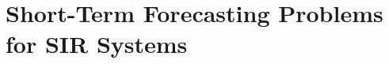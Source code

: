 \section{Short-Term Forecasting Problems for SIR Systems}
\label{sec:prob_form}

\iffalse


\newcommand{\tNewInfs}{\mbox{$t$}-\textsc{NewInf}\mbox{$(S)$}}
\newcommand{\tNewInfv}{\mbox{$t$}-\textsc{NewInf}\mbox{$(V)$}}
\newcommand{\tTotInfs}{\mbox{$t$}-\textsc{TotInf}\mbox{$(S)$}}
\newcommand{\tTotInfv}{\mbox{$t$}-\textsc{TotInf}\mbox{$(V)$}}
\newcommand{\tPeak}{\mbox{$t$}-\textsc{Peak}}
\newcommand{\tVuls}{\mbox{$t$}-\textsc{Vul}\mbox{$(S)$}}
\newcommand{\tVulv}{\mbox{$t$}-\textsc{Vul}\mbox{$(V)$}}
\newcommand{\tTotVuls}{\mbox{$t$}-\textsc{TotVul}\mbox{$(S)$}}
\newcommand{\tTotVulv}{\mbox{$t$}-\textsc{TotVul}\mbox{$(V)$}}

\newcommand{\TwoNewInfs}{\mbox{$2$}-\textsc{NewInf}\mbox{$(S)$}}
\newcommand{\TwoNewInfv}{\mbox{$2$}-\textsc{NewInf}\mbox{$(V)$}}
\newcommand{\TwoTotInfs}{\mbox{$2$}-\textsc{TotInf}\mbox{$(S)$}}
\newcommand{\TwoTotInfv}{\mbox{$2$}-\textsc{TotInf}\mbox{$(V)$}}
\newcommand{\TwoPeak}{\mbox{$2$}-\textsc{Peak}}
\newcommand{\TwoVuls}{\mbox{$2$}-\textsc{Vul}\mbox{$(S)$}}
\newcommand{\TwoVulv}{\mbox{$2$}-\textsc{Vul}\mbox{$(V)$}}
\newcommand{\TwoTotVuls}{\mbox{$2$}-\textsc{TotVul}\mbox{$(S)$}}
\newcommand{\TwoTotVulv}{\mbox{$2$}-\textsc{TotVul}\mbox{$(V)$}}

\newcommand{\OneNewInfs}{\mbox{$1$}-\textsc{NewInf}\mbox{$(S)$}}
\newcommand{\OneNewInfv}{\mbox{$1$}-\textsc{NewInf}\mbox{$(V)$}}
\newcommand{\OneTotInfs}{\mbox{$1$}-\textsc{TotInf}\mbox{$(S)$}}
\newcommand{\OneTotInfv}{\mbox{$1$}-\textsc{TotInf}\mbox{$(V)$}}
\newcommand{\OnePeak}{\mbox{$1$}-\textsc{Peak}}
\newcommand{\OneVuls}{\mbox{$1$}-\textsc{Vul}\mbox{$(S)$}}
\newcommand{\OneVulv}{\mbox{$1$}-\textsc{Vul}\mbox{$(V)$}}
\newcommand{\OneTotVuls}{\mbox{$1$}-\textsc{TotVul}\mbox{$(S)$}}
\newcommand{\OneTotVulv}{\mbox{$1$}-\textsc{TotVul}\mbox{$(V)$}}

\newcommand{\ThrNewInfs}{\mbox{$3$}-\textsc{NewInf}\mbox{$(S)$}}
\newcommand{\ThrNewInfv}{\mbox{$3$}-\textsc{NewInf}\mbox{$(V)$}}
\newcommand{\ThrTotInfs}{\mbox{$3$}-\textsc{Tot}\mbox{$(S)$}}
\newcommand{\ThrTotInfv}{\mbox{$3$}-\textsc{Tot}\mbox{$(V)$}}
\fi

